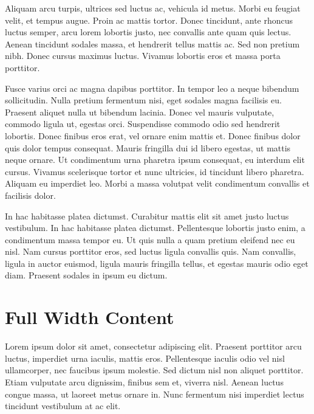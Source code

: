 \documentclass[a4paper]{CSMakotoTechnicalReport}
\begin{document}
\begin{multicols}{2}
    Aliquam arcu turpis, ultrices sed luctus ac, vehicula id metus. Morbi eu feugiat velit, et tempus augue. Proin ac mattis tortor. Donec tincidunt, ante rhoncus luctus semper, arcu lorem lobortis justo, nec convallis ante quam quis lectus. Aenean tincidunt sodales massa, et hendrerit tellus mattis ac. Sed non pretium nibh. Donec cursus maximus luctus. Vivamus lobortis eros et massa porta porttitor.

    Fusce varius orci ac magna dapibus porttitor. In tempor leo a neque bibendum sollicitudin. Nulla pretium fermentum nisi, eget sodales magna facilisis eu. Praesent aliquet nulla ut bibendum lacinia. Donec vel mauris vulputate, commodo ligula ut, egestas orci. Suspendisse commodo odio sed hendrerit lobortis. Donec finibus eros erat, vel ornare enim mattis et. Donec finibus dolor quis dolor tempus consequat. Mauris fringilla dui id libero egestas, ut mattis neque ornare. Ut condimentum urna pharetra ipsum consequat, eu interdum elit cursus. Vivamus scelerisque tortor et nunc ultricies, id tincidunt libero pharetra. Aliquam eu imperdiet leo. Morbi a massa volutpat velit condimentum convallis et facilisis dolor.

    In hac habitasse platea dictumst. Curabitur mattis elit sit amet justo luctus vestibulum. In hac habitasse platea dictumst. Pellentesque lobortis justo enim, a condimentum massa tempor eu. Ut quis nulla a quam pretium eleifend nec eu nisl. Nam cursus porttitor eros, sed luctus ligula convallis quis. Nam convallis, ligula in auctor euismod, ligula mauris fringilla tellus, et egestas mauris odio eget diam. Praesent sodales in ipsum eu dictum.


\end{multicols} %


\section{Full Width Content}

Lorem ipsum dolor sit amet, consectetur adipiscing elit. Praesent porttitor arcu luctus, imperdiet urna iaculis, mattis eros. Pellentesque iaculis odio vel nisl ullamcorper, nec faucibus ipsum molestie. Sed dictum nisl non aliquet porttitor. Etiam vulputate arcu dignissim, finibus sem et, viverra nisl. Aenean luctus congue massa, ut laoreet metus ornare in. Nunc fermentum nisi imperdiet lectus tincidunt vestibulum at ac elit.
\end{document}
